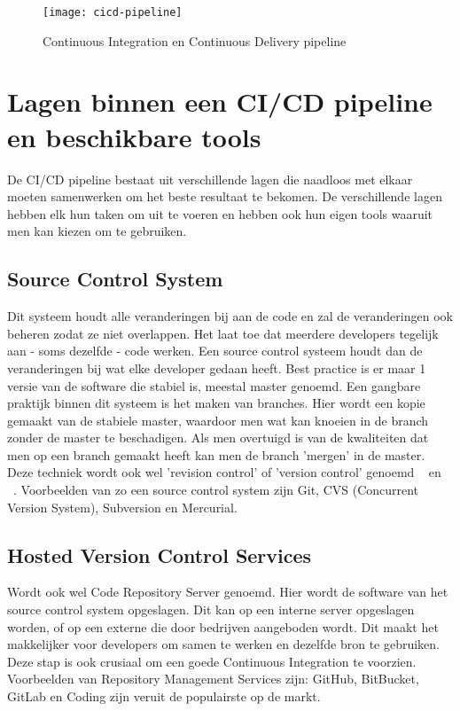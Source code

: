 \begin{figure}	
    \texttt{[image: cicd-pipeline]}
    \caption{Continuous Integration en Continuous Delivery pipeline ~\autocite{Tuli2018}} \label{cicd-pipeline}
\end{figure}

\section{Lagen binnen een CI/CD pipeline en beschikbare tools}
De CI/CD pipeline bestaat uit verschillende lagen die naadloos met elkaar moeten samenwerken om het beste resultaat te bekomen. De verschillende lagen hebben elk hun taken om uit te voeren en hebben ook hun eigen tools waaruit men kan kiezen om te gebruiken.

    \subsection{Source Control System}
    Dit systeem houdt alle veranderingen bij aan de code en zal de veranderingen ook beheren zodat ze niet overlappen. Het laat toe dat meerdere developers tegelijk aan - soms dezelfde - code werken. Een source control systeem houdt dan de veranderingen bij wat elke developer gedaan heeft. Best practice is er maar 1 versie van de software die stabiel is, meestal master genoemd. Een gangbare praktijk binnen dit systeem is het maken van branches. Hier wordt een kopie gemaakt van de stabiele master, waardoor men wat kan knoeien in de branch zonder de master te beschadigen. Als men overtuigd is van de kwaliteiten dat men op een branch gemaakt heeft kan men de branch 'mergen' in de master. Deze techniek wordt ook wel 'revision control' of 'version control' genoemd ~\autocite{Skelton2014} en ~\autocite{Riti2018}.
    Voorbeelden van zo een source control system zijn Git, CVS (Concurrent Version System), Subversion en Mercurial.
    
    \subsection{Hosted Version Control Services}
    Wordt ook wel Code Repository Server genoemd. Hier wordt de software van het source control system opgeslagen. Dit kan op een interne server opgeslagen worden, of op een externe die door bedrijven aangeboden wordt. Dit maakt het makkelijker voor developers om samen te werken en dezelfde bron te gebruiken. Deze stap is ook crusiaal om een goede Continuous Integration te voorzien.
    Voorbeelden van Repository Management Services zijn: GitHub, BitBucket, GitLab en Coding zijn veruit de populairste op de markt.
    
